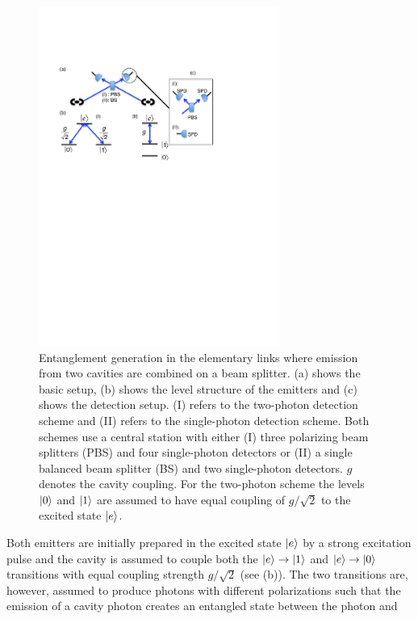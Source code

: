 \begin{figure} 
\centering
\includegraphics[width=0.7\textwidth]{./figs_Borregaard_PRA2015/figure2}
\caption[Entanglement generation]{Entanglement generation in the elementary
links where emission from two cavities are combined on a beam splitter. (a)
shows the basic setup, (b) shows the level structure of the emitters and (c)
shows the detection setup.  (I) refers to the two-photon detection scheme and
(II) refers to the single-photon detection scheme. Both schemes use a central
station with either (I) three polarizing beam splitters (PBS) and four
single-photon detectors or (II) a single balanced beam splitter (BS) and two
single-photon detectors.  $g$ denotes the cavity coupling. For the two-photon
scheme the levels $| 0 \rangle$ and $| 1 \rangle$ are assumed to have equal coupling of
$g/\sqrt{2}$ to the excited state $| e \rangle$.}
\label{fig:figure2}
\end{figure} 
Both emitters are initially prepared in the excited state $| e \rangle$ by a strong
excitation pulse and the cavity is assumed to couple both the
$| e \rangle\to| 1 \rangle$ and $| e \rangle\to| 0 \rangle$ transitions with equal coupling
strength $g/\sqrt{2}$ (see (b)). The two transitions are,
however, assumed to produce photons with different polarizations such that the
emission of a cavity photon creates an entangled state between the photon and
